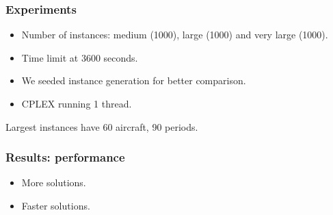 \begin{frame}
\frametitle{\textbf{Experiments}}
  
  \begin{itemize}
  \item Number of instances: medium (1000), large (1000) and very large
    (1000).
  \item Time limit at 3600 seconds.
  \item We seeded instance generation for better comparison.
  \item CPLEX running 1 thread.
  \end{itemize}

  Largest instances have 60 aircraft, 90 periods.
\end{frame}

\begin{frame}
\frametitle{\textbf{Results: performance}}

  \begin{itemize}[<+->]
    \item More solutions.
    \item Faster solutions.
  \end{itemize}

\end{frame}

